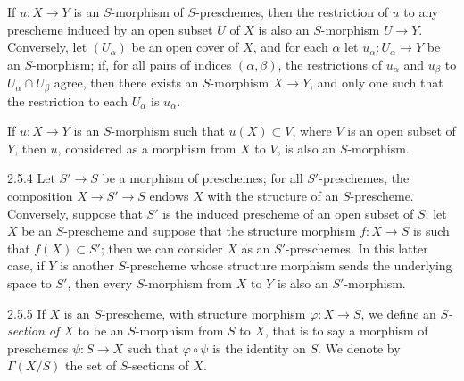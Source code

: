 If $u\colon X\to Y$ is an $S$-morphism of $S$-preschemes, then the restriction
of $u$ to any prescheme induced by an open subset $U$ of $X$ is also an
$S$-morphism $U\to Y$. Conversely, let $(U_\alpha)$ be an open cover of $X$,
and for each $\alpha$ let $u_\alpha\colon U_\alpha\to Y$ be an $S$-morphism; if,
for all pairs of indices $(\alpha,\beta)$, the restrictions of $u_\alpha$ and
$u_\beta$ to $U_\alpha\cap U_\beta$ agree, then there exists an $S$-morphism
$X\to Y$, and only one such that the restriction to each $U_\alpha$ is
$u_\alpha$.

If $u\colon X\to Y$ is an $S$-morphism such that $u(X)\subset V$, where $V$ is
an open subset of $Y$, then $u$, considered as a morphism from $X$ to $V$, is
also an $S$-morphism.

\begin{env}{2.5.4}
\label{env-1.2.5.4}
Let $S'\to S$ be a morphism of preschemes; for all
$S'$-preschemes, the composition $X\to S'\to S$ endows $X$ with the structure of
an $S$-prescheme. Conversely, suppose that $S'$ is the induced prescheme of an
open subset of $S$; let $X$ be an $S$-prescheme and suppose that the structure
morphism $f\colon X\to S$ is such that $f(X)\subset S'$; then we can consider
$X$ as an $S'$-preschemes. In this latter case, if $Y$ is another $S$-prescheme
whose structure morphism sends the underlying space to $S'$, then every
$S$-morphism from $X$ to $Y$ is also an $S'$-morphism.
\end{env}

\begin{env}{2.5.5}
\label{env-1.2.5.5}
If $X$ is an $S$-prescheme, with structure morphism
$\varphi\colon X\to S$, we define an \emph{$S$-section of $X$} to be an
$S$-morphism from $S$ to $X$, that is to say a morphism of preschemes
$\psi\colon S\to X$ such that $\varphi\circ\psi$ is the identity on $S$.  We
denote by $\Gamma(X/S)$ the set of $S$-sections of $X$.
\end{env}

